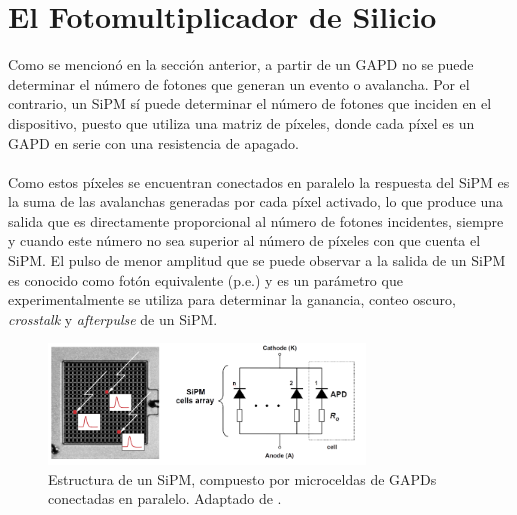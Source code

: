 \section{El Fotomultiplicador de Silicio}
Como se mencionó en la sección anterior, a partir de un GAPD no se puede determinar el número de fotones que generan un evento o avalancha. Por el contrario, un SiPM sí puede determinar el número de fotones que inciden en el dispositivo, puesto que utiliza una matriz de píxeles, donde cada píxel es un  GAPD en serie con una resistencia de apagado. \\ \\
Como estos píxeles se encuentran conectados en paralelo la respuesta del SiPM es la suma de las avalanchas generadas por cada píxel activado, lo que produce una salida que es directamente proporcional al número de fotones incidentes, siempre y cuando este número no sea superior al número de píxeles con que cuenta el SiPM. El pulso de menor amplitud que se puede observar a la salida de un SiPM es conocido como fotón equivalente (p.e.) y es un parámetro que experimentalmente se utiliza para determinar la ganancia, conteo oscuro, \textit{crosstalk} y \textit{afterpulse} de un SiPM.
\begin{figure}[h!]
\begin{centering}
  \includegraphics[width=0.75\textwidth]{Images/APD_array.PNG}
    \caption{Estructura de un SiPM, compuesto por microceldas de GAPDs conectadas en paralelo. Adaptado de \citep{Muon_counting_Amiga}.}
    \label{fig:APD_array}  
  \par\end{centering}
\end{figure}
